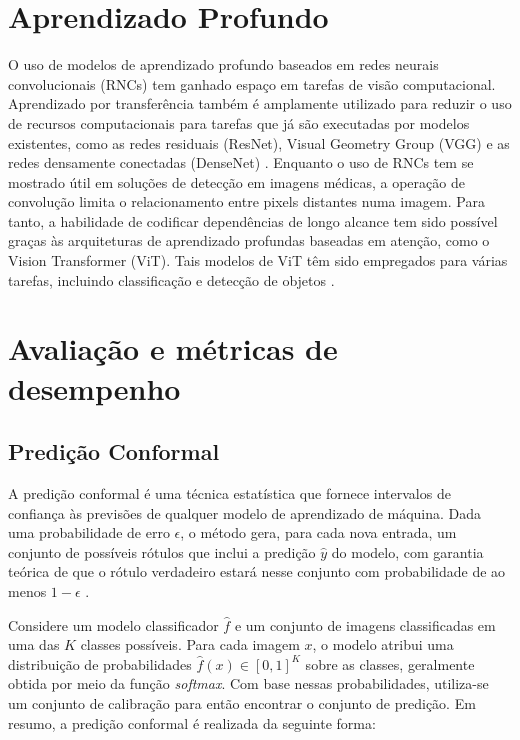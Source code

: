 \section{Aprendizado Profundo}\label{sec:aprendizado-profundo}

O uso de modelos de aprendizado profundo baseados em redes neurais convolucionais (RNCs) tem ganhado espaço em tarefas de visão computacional. Aprendizado por transferência também é amplamente utilizado para reduzir o uso de recursos computacionais para tarefas que já são executadas por modelos existentes, como as redes residuais (ResNet), Visual Geometry Group (VGG) e as redes densamente conectadas (DenseNet) \cite{Tariq2023}. Enquanto o uso de RNCs tem se mostrado útil em soluções de detecção em imagens médicas, a operação de convolução limita o relacionamento entre pixels distantes numa imagem. Para tanto, a habilidade de codificar dependências de longo alcance tem sido possível graças às arquiteturas de aprendizado profundas baseadas em atenção, como o Vision Transformer (ViT). Tais modelos de ViT têm sido empregados para várias tarefas, incluindo classificação e detecção de objetos \cite{Shamshad2023}.


\section{Avaliação e métricas de desempenho} \label{sec:avaliacao-metricas}

\subsection{Predição Conformal}

A predição conformal é uma técnica estatística que fornece intervalos de confiança às previsões de qualquer modelo de aprendizado de máquina. Dada uma probabilidade de erro $\epsilon$, o método gera, para cada nova entrada, um conjunto de possíveis rótulos que inclui a predição $\hat{y}$ do modelo, com garantia teórica de que o rótulo verdadeiro estará nesse conjunto com probabilidade de ao menos $1 - \epsilon$ \citep{angelopoulos2021gentle}.

Considere um modelo classificador $\hat{f}$ e um conjunto de imagens classificadas em uma das $K$ classes possíveis. Para cada imagem $x$, o modelo atribui uma distribuição de probabilidades $\hat{f}(x) \in [0,1]^K$ sobre as classes, geralmente obtida por meio da função \textit{softmax}. Com base nessas probabilidades, utiliza-se um conjunto de calibração para então encontrar o conjunto de predição. Em resumo, a predição conformal é realizada da seguinte forma:

